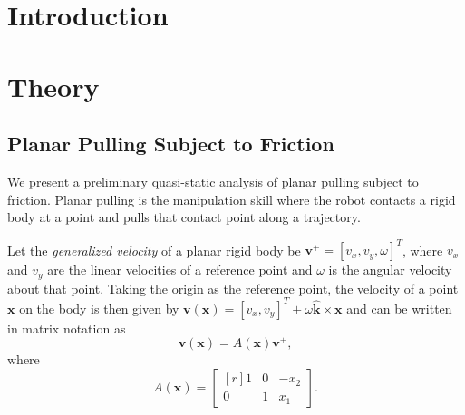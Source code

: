 \documentclass[conference]{IEEEtran}
\begin{document}
\begin{abstract}
\end{abstract}

\IEEEpeerreviewmaketitle

\section{Introduction}

\section{Theory}

\subsection{Planar Pulling Subject to Friction}\label{sec:planar-pulling}

We present a preliminary quasi-static analysis of planar pulling
subject to friction. Planar pulling is the manipulation skill where
the robot contacts a rigid body at a point and pulls that contact
point along a trajectory. 

Let the \textit{generalized velocity} of a planar rigid body be
$\mathbf{v}^+ = [v_x, v_y, \omega]^T$, where $v_x$ and $v_y$ are the
linear velocities of a reference point and $\omega$ is the angular
velocity about that point. Taking the origin as the reference point,
the velocity of a point $\mathbf{x}$ on the body is then given by
$\mathbf{v}(\mathbf{x}) = [v_x, v_y]^T + \omega\hat{\mathbf{k}} \times
\mathbf{x}$ and can be written in matrix notation as
\begin{equation} \label{eq:generalized-velocity}
\mathbf{v}(\mathbf{x}) = A(\mathbf{x})\mathbf{v}^+,
\end{equation}
where
\begin{equation}
  A(\mathbf{x}) = 
  \begin{bmatrix*}[r]
    1 & 0 & -x_2 \\
    0 & 1 &  x_1
  \end{bmatrix*}.
\end{equation}
\end{document}
